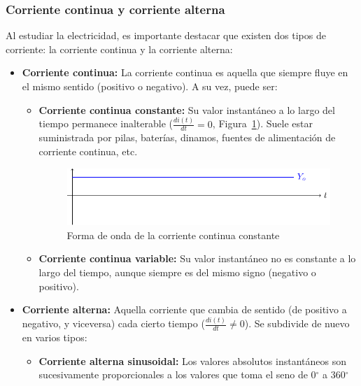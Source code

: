 	\subsubsection{Corriente continua y corriente
          alterna} \label{sec:cc-ca} Al estudiar la electricidad, es
        importante destacar que existen dos tipos de corriente: la
        corriente continua y la corriente alterna:
	\begin{itemize}
        \item \textbf{Corriente continua:} La corriente continua es
          aquella que siempre fluye en el mismo sentido (positivo o
          negativo). A su vez, puede ser:
          \begin{itemize}
          \item \textbf{Corriente continua constante:} Su valor
            instantáneo a lo largo del tiempo permanece inalterable
            ($\frac{di(t)}{dt} = 0$, Figura~\ref{fig:continua}). Suele
            estar suministrada por pilas, baterías, dinamos, fuentes
            de alimentación de corriente continua, etc.
            \begin{figure}[H]
              \centering
              \includegraphics[width=0.75\linewidth]{../figs/continua.pdf}
              \caption{Forma de onda de la corriente continua
                constante}
              \label{fig:continua}
            \end{figure}
          \item \textbf{Corriente continua variable:} Su valor
            instantáneo no es constante a lo largo del tiempo, aunque
            siempre es del mismo signo (negativo o positivo).
          \end{itemize}
        \item \textbf{Corriente alterna:} Aquella corriente que cambia
          de sentido (de positivo a negativo, y viceversa) cada cierto
          tiempo ($\frac{di(t)}{dt} \neq 0$). Se subdivide de nuevo en
          varios tipos:
          \begin{itemize}
          \item \textbf{Corriente alterna sinusoidal:} Los valores
            absolutos instantáneos son sucesivamente proporcionales a
            los valores que toma el seno de 0$^\circ$ a 360$^\circ$

\end{itemize}
\end{itemize}
